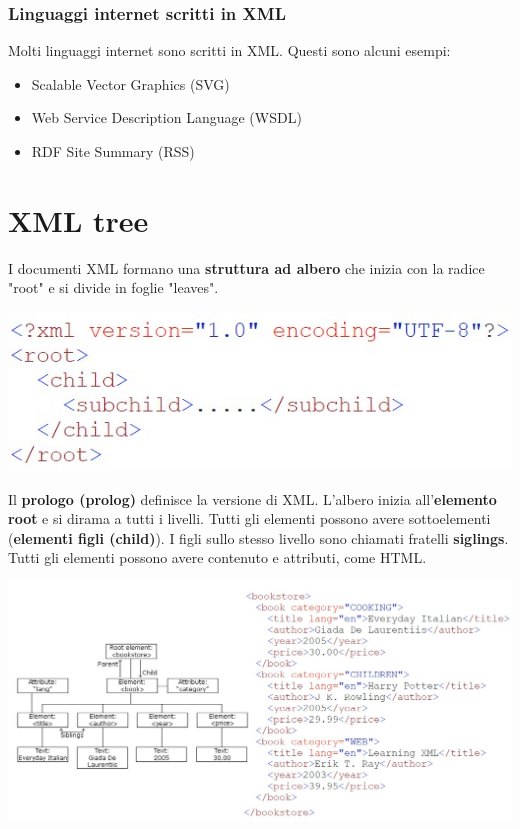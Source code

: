 \subsubsection{Linguaggi internet scritti in XML}
Molti linguaggi internet sono scritti in XML. Questi sono alcuni esempi:
\begin{itemize}
    \item Scalable Vector Graphics (SVG)
    \item Web Service Description Language (WSDL)
    \item RDF Site Summary (RSS)
\end{itemize}


\section{XML tree}
I documenti XML formano una \textbf{struttura ad albero} che inizia con la radice "root" e si divide in foglie "leaves". 

\begin{center}
    \includegraphics[scale=0.4]{Images/TecnologieWeb/5/Root.jpg}
\end{center}

Il \textbf{prologo (prolog)} definisce la versione di XML. L'albero inizia all'\textbf{elemento root} e si dirama a tutti i livelli. Tutti gli elementi possono avere sottoelementi (\textbf{elementi figli (child)}). I figli sullo stesso livello sono chiamati fratelli \textbf{siglings}. Tutti gli elementi possono avere contenuto e attributi, come HTML.

\begin{center}
    \includegraphics[scale=0.4]{Images/TecnologieWeb/5/ExampleTRee.jpg}
\end{center}

